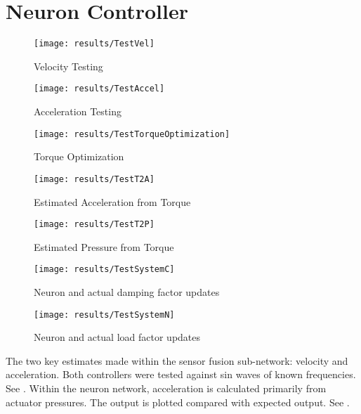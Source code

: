 \section{Neuron Controller}




\begin{figure}
\centering
\texttt{[image: results/TestVel]}
\caption{Velocity Testing}
\label{fig:TestVel}
\end{figure}

\begin{figure}
\centering
\texttt{[image: results/TestAccel]}
\caption{Acceleration Testing}
\label{fig:TestAccel}
\end{figure}

\begin{figure}
\centering
\texttt{[image: results/TestTorqueOptimization]}
\caption{Torque Optimization}
\label{fig:TestTorqueOptimization}
\end{figure}

\begin{figure}
\centering
\texttt{[image: results/TestT2A]}
\caption{Estimated Acceleration from Torque}
\label{fig:TestT2A}
\end{figure}

\begin{figure}
\centering
\texttt{[image: results/TestT2P]}
\caption{Estimated Pressure from Torque}
\label{fig:TestT2P}
\end{figure}

\begin{figure}
\centering
\texttt{[image: results/TestSystemC]}
\caption{Neuron and actual damping factor updates}
\label{fig:TestSystemC1}
\end{figure}

\begin{figure}
\centering
\texttt{[image: results/TestSystemN]}
\caption{Neuron and actual load factor updates}
\label{fig:TestSystemN}
\end{figure}


The two key estimates made within the sensor fusion sub-network: velocity and
acceleration. Both controllers were tested against sin waves of known
frequencies. See .
Within the neuron network, acceleration is calculated primarily from actuator
pressures. The output is plotted compared with expected output. See
.

